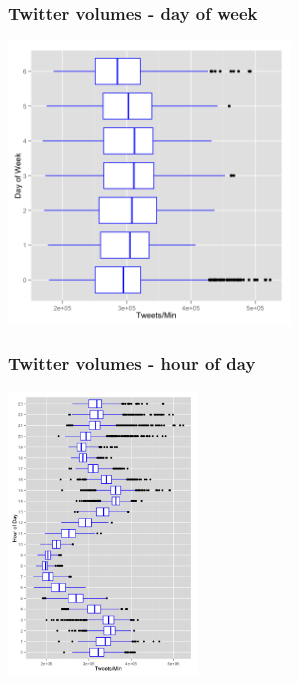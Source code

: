 \documentclass{beamer}
\begin{document}
\begin{frame}\frametitle{Twitter volumes - day of week}
  \begin{center}
    \includegraphics[width=7.5cm]{./imgs/dow.png}
  \end{center}
\end{frame}

\begin{frame}\frametitle{Twitter volumes - hour of day}
  \begin{center}
    \includegraphics[width=5cm]{./imgs/hour.png}
  \end{center}
\end{frame}

\end{document}
